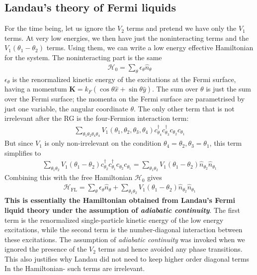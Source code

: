 \documentclass[14pt]{extarticle}
\begin{document}
\subsection{Landau's theory of Fermi liquids}
For the time being, let us ignore the \(V_2\) terms and pretend we have only the \(V_1\) terms. At very low energies, we then have just the noninteracting terms and the \(V_1(\theta_1 - \theta_2)\) terms. Using them, we can write a low energy effective Hamiltonian for the system. The noninteracting part is the same
\begin{equation}\begin{aligned}
\mathcal{H}_0 = \sum_{\theta}\epsilon_\theta \hat n_{\theta}
\end{aligned}\end{equation}
\(\epsilon_\theta\) is the renormalized kinetic energy of the excitations at the Fermi surface, having a momentum \(\mathbf{K}=k_F\left(\cos \theta \hat x + \sin \theta \hat y\right)\). The sum over \(\theta\) is just the sum over the Fermi surface; the momenta on the Fermi surface are parametrised by just one variable, the angular coordinate \(\theta\). The only other term that is not irrelevant after the RG is the four-Fermion interaction term: 
\begin{equation}\begin{aligned}
\sum_{\theta_1\theta_2\theta_4\theta_4}V_1(\theta_1,\theta_2,\theta_3,\theta_4)c^\dagger_{\theta_4} c^\dagger_{\theta_3}c_{\theta_2}c_{\theta_1}
\end{aligned}\end{equation}
But since \(V_1\) is only non-irrelevant on the condition \(\theta_4 = \theta_2, \theta_3=\theta_1\), this term simplifies to
\begin{equation}\begin{aligned}
\sum_{\theta_1\theta_2}V_1(\theta_1-\theta_2)c^\dagger_{\theta_2} c^\dagger_{\theta_1}c_{\theta_2}c_{\theta_1} = \sum_{\theta_1\theta_2}V_1(\theta_1-\theta_2) \hat n_{\theta_2} \hat n_{\theta_1}
\end{aligned}\end{equation}
Combining this with the free Hamiltonian \(\mathcal{H}_0\) gives
\begin{equation}\begin{aligned}
\mathcal{H}_\text{FL} = \sum_{\theta}\epsilon_\theta \hat n_{\theta} + \sum_{\theta_1\theta_2}V_1(\theta_1-\theta_2) \hat n_{\theta_2} \hat n_{\theta_1}
\end{aligned}\end{equation}
\textbf{This is essentially the Hamiltonian obtained from Landau's Fermi liquid theory under the assumption of \textit{adiabatic continuity}}. The first term is the renormalized single-particle kinetic energy of the low energy excitations, while the second term is the number-diagonal interaction between these excitations. The assumption of \textit{adiabatic continuity} was invoked when we ignored the presence of the \(V_2\) terms and hence avoided any phase transitions. This also justifies why Landau did not need to keep higher order diagonal terms In the Hamiltonian- such terms are irrelevant.
 
\end{document}
